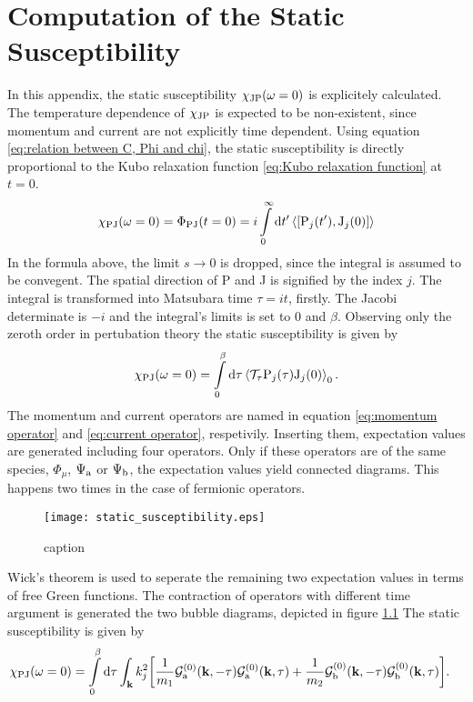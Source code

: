 %
%
\chapter{Computation of the Static Susceptibility}
\label{appch:static susceptibility}
%
%
In this appendix, the static susceptibility $\chi_{\mathrm{JP}}(\omega=0)$ is explicitely calculated.
The temperature dependence of $\chi_{\mathrm{JP}}$ is expected to be non-existent, since momentum and current are not explicitly time dependent.
Using equation \eqref{eq:relation between C, Phi and chi}, the static susceptibility is directly proportional to the Kubo relaxation function \eqref{eq:Kubo relaxation function} at $t=0$.
%
\begin{align}
	\chi_{\mt{PJ}}(\omega = 0) = \Phi_{\mt{PJ}}(t = 0) = i \int\limits_{0}^{\infty} \dd{t'} \expval{\comm{\mt{P}_{j}(t')}{\mt{J}_{j}(0)}}
\end{align}
%
In the formula above, the limit $s\to0$ is dropped, since the integral is assumed to be convegent.
The spatial direction of P and J is signified by the index $j$.
The integral is transformed into Matsubara time $\tau = it$, firstly.
The Jacobi determinate is $-i$ and the integral's limits is set to $0$ and $\beta$.
Observing only the zeroth order in pertubation theory the static susceptibility is given by
%
\begin{align}
	\chi_{\mathrm{PJ}}(\omega = 0) = \int\limits_{0}^{\beta} \dd{\tau} \expval{\mathcal{T}_{\tau} \mathrm{P}_{j}(\tau) \mathrm{J}_{j}(0)}_{0}.
\end{align}
%
The momentum and current operators are named in equation \eqref{eq:momentum operator} and \eqref{eq:current operator}, respetivily.
Inserting them, expectation values are generated including four operators.
Only if these operators are of the same species, $\Phi_{\mu}$, $\Psi_{\mathrm{a}}$ or $\Psi_{\mathrm{b}}$, the expectation values yield connected diagrams.
This happens two times in the case of fermionic operators.
%
\begin{figure}[t]
	\centering
	\texttt{[image: static\_susceptibility.eps]}
	\caption{caption}
	\label{fig:static susceptibility}
\end{figure}
%
Wick's theorem is used to seperate the remaining two expectation values in terms of free Green functions.
The contraction of operators with different time argument is generated the two bubble diagrams, depicted in figure \ref{fig:static susceptibility}
The static susceptibility is given by
%
\begin{align}
	\chi_{\mathrm{PJ}}(\omega = 0) &= 
		\int\limits_{0}^{\beta} \dd{\tau} 
		\int_{\vb{k}} 
		k_{j}^{2}
		\bigg[
			\frac{1}{m_{1}}
			\mathcal{G}_{\mathrm{a}}^{(0)}(\vb{k},-\tau)
			\mathcal{G}_{\mathrm{a}}^{(0)}(\vb{k},\tau)
			+
			\frac{1}{m_{2}}
			\mathcal{G}_{\mathrm{b}}^{(0)}(\vb{k},-\tau)
			\mathcal{G}_{\mathrm{b}}^{(0)}(\vb{k},\tau)
		\bigg].
\end{align}
